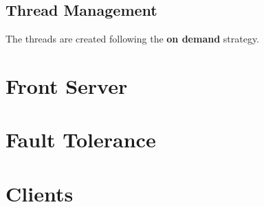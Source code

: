 \documentclass[12pt]{article} %
\begin{document}
\subsection{Thread Management}
\label{sub:ThreadManagement}

The threads are created following the \textbf{on demand} strategy.

\section{Front Server}
\label{sec:FrontServer}

\section{Fault Tolerance}
\label{sec:FaultTolerance}

\section{Clients}
\label{sec:Clients}
\end{document}
